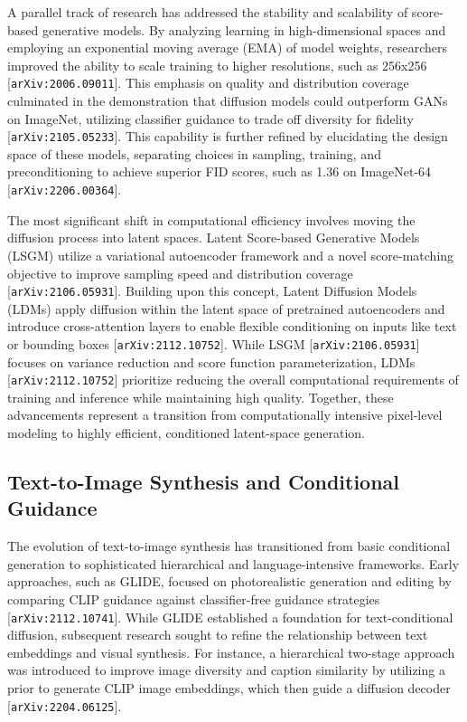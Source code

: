 \documentclass[11pt]{article}
\begin{document}
A parallel track of research has addressed the stability and scalability of score-based generative models. By analyzing learning in high-dimensional spaces and employing an exponential moving average (EMA) of model weights, researchers improved the ability to scale training to higher resolutions, such as 256x256 [\texttt{arXiv:2006.09011}]. This emphasis on quality and distribution coverage culminated in the demonstration that diffusion models could outperform GANs on ImageNet, utilizing classifier guidance to trade off diversity for fidelity [\texttt{arXiv:2105.05233}]. This capability is further refined by elucidating the design space of these models, separating choices in sampling, training, and preconditioning to achieve superior FID scores, such as 1.36 on ImageNet-64 [\texttt{arXiv:2206.00364}].

The most significant shift in computational efficiency involves moving the diffusion process into latent spaces. Latent Score-based Generative Models (LSGM) utilize a variational autoencoder framework and a novel score-matching objective to improve sampling speed and distribution coverage [\texttt{arXiv:2106.05931}]. Building upon this concept, Latent Diffusion Models (LDMs) apply diffusion within the latent space of pretrained autoencoders and introduce cross-attention layers to enable flexible conditioning on inputs like text or bounding boxes [\texttt{arXiv:2112.10752}]. While LSGM [\texttt{arXiv:2106.05931}] focuses on variance reduction and score function parameterization, LDMs [\texttt{arXiv:2112.10752}] prioritize reducing the overall computational requirements of training and inference while maintaining high quality. Together, these advancements represent a transition from computationally intensive pixel-level modeling to highly efficient, conditioned latent-space generation.

\subsection{Text-to-Image Synthesis and Conditional Guidance}

The evolution of text-to-image synthesis has transitioned from basic conditional generation to sophisticated hierarchical and language-intensive frameworks. Early approaches, such as GLIDE, focused on photorealistic generation and editing by comparing CLIP guidance against classifier-free guidance strategies [\texttt{arXiv:2112.10741}]. While GLIDE established a foundation for text-conditional diffusion, subsequent research sought to refine the relationship between text embeddings and visual synthesis. For instance, a hierarchical two-stage approach was introduced to improve image diversity and caption similarity by utilizing a prior to generate CLIP image embeddings, which then guide a diffusion decoder [\texttt{arXiv:2204.06125}].
\end{document}
